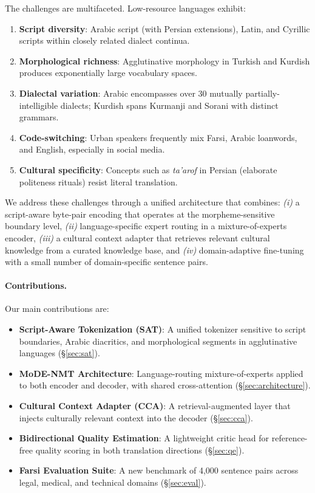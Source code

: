 \documentclass[11pt,twocolumn]{article}
\begin{document}
The challenges are multifaceted. Low-resource languages exhibit:
\begin{enumerate}[leftmargin=*,noitemsep]
  \item \textbf{Script diversity}: Arabic script (with Persian extensions),
        Latin, and Cyrillic scripts within closely related dialect continua.
  \item \textbf{Morphological richness}: Agglutinative morphology in Turkish
        and Kurdish produces exponentially large vocabulary spaces.
  \item \textbf{Dialectal variation}: Arabic encompasses over 30 mutually
        partially-intelligible dialects; Kurdish spans Kurmanji and Sorani
        with distinct grammars.
  \item \textbf{Code-switching}: Urban speakers frequently mix Farsi, Arabic
        loanwords, and English, especially in social media.
  \item \textbf{Cultural specificity}: Concepts such as \textit{ta'arof} in
        Persian (elaborate politeness rituals) resist literal translation.
\end{enumerate}

We address these challenges through a unified architecture that combines:
\textit{(i)} a script-aware byte-pair encoding that operates at the
morpheme-sensitive boundary level, \textit{(ii)} language-specific expert
routing in a mixture-of-experts encoder, \textit{(iii)} a cultural context
adapter that retrieves relevant cultural knowledge from a curated knowledge
base, and \textit{(iv)} domain-adaptive fine-tuning with a small number of
domain-specific sentence pairs.

\paragraph{Contributions.} Our main contributions are:
\begin{itemize}[leftmargin=*,noitemsep]
  \item \textbf{Script-Aware Tokenization (SAT)}: A unified tokenizer
        sensitive to script boundaries, Arabic diacritics, and morphological
        segments in agglutinative languages (\S\ref{sec:sat}).
  \item \textbf{MoDE-NMT Architecture}: Language-routing mixture-of-experts
        applied to both encoder and decoder, with shared cross-attention
        (\S\ref{sec:architecture}).
  \item \textbf{Cultural Context Adapter (CCA)}: A retrieval-augmented
        layer that injects culturally relevant context into the decoder
        (\S\ref{sec:cca}).
  \item \textbf{Bidirectional Quality Estimation}: A lightweight critic head
        for reference-free quality scoring in both translation directions
        (\S\ref{sec:qe}).
  \item \textbf{Farsi Evaluation Suite}: A new benchmark of 4,000 sentence
        pairs across legal, medical, and technical domains (\S\ref{sec:eval}).
\end{itemize}
\end{document}
